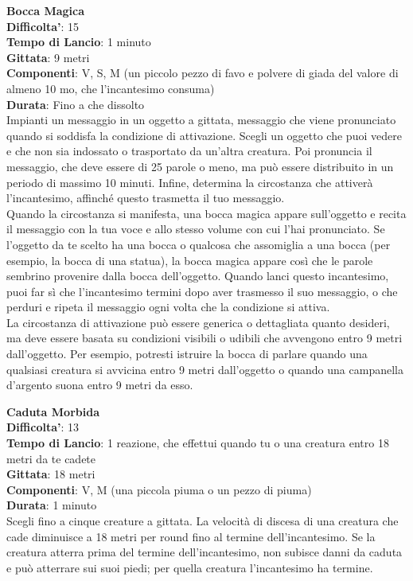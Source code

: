 \begin{multicols}{2}
\medskip\textbf{Bocca Magica}\\
\textbf{Difficolta'}: 15\\
\textbf{Tempo di Lancio}: 1 minuto\\
\textbf{Gittata}: 9 metri\\
\textbf{Componenti}: V, S, M (un piccolo pezzo di favo e polvere di giada del valore di almeno 10 mo, che l’incantesimo consuma)\\
\textbf{Durata}: Fino a che dissolto\\
Impianti un messaggio in un oggetto a gittata, messaggio che viene pronunciato quando si soddisfa la condizione di attivazione. Scegli un oggetto che puoi vedere e che non sia indossato o trasportato da un’altra creatura. Poi pronuncia il messaggio, che deve essere di 25 parole o meno, ma può essere distribuito in un periodo di massimo 10 minuti. Infine, determina la circostanza che attiverà l’incantesimo, affinché questo trasmetta il tuo messaggio.\\
Quando la circostanza si manifesta, una bocca magica appare sull’oggetto e recita il messaggio con la tua voce e allo stesso volume con cui l’hai pronunciato. Se l’oggetto da te scelto ha una bocca o qualcosa che assomiglia a una bocca (per esempio, la bocca di una statua), la bocca magica appare così che le parole sembrino provenire dalla bocca dell’oggetto. Quando lanci questo incantesimo, puoi far sì che l’incantesimo termini dopo aver trasmesso il suo messaggio, o che perduri e ripeta il messaggio ogni volta che la condizione si attiva.\\
La circostanza di attivazione può essere generica o dettagliata quanto desideri, ma deve essere basata su condizioni visibili o udibili che avvengono entro 9 metri dall’oggetto. Per esempio, potresti istruire la bocca di parlare quando una qualsiasi creatura si avvicina entro  9 metri dall’oggetto o quando una campanella d’argento suona entro 9 metri da esso.


\medskip\textbf{Caduta Morbida}\\
\textbf{Difficolta'}: 13\\
\textbf{Tempo di Lancio}: 1 reazione, che effettui quando tu o una creatura entro 18 metri da te cadete\\
\textbf{Gittata}: 18 metri\\
\textbf{Componenti}: V, M (una piccola piuma o un pezzo di piuma)\\
\textbf{Durata}: 1 minuto\\
Scegli fino a cinque creature a gittata. La velocità di discesa di una creatura che cade diminuisce a 18 metri per round fino al termine dell’incantesimo. Se la creatura atterra prima del termine dell’incantesimo, non subisce danni da caduta e può atterrare sui suoi piedi; per quella creatura l’incantesimo ha termine.\\



\end{multicols}
